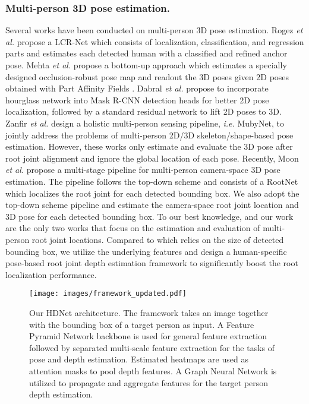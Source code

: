 \documentclass[runningheads]{llncs}
\begin{document}
\subsubsection{Multi-person 3D pose estimation.}
Several works \cite{rogez2017lcr,rogez2019lcr,singleshotmultiperson2018,dabral2019multi,zanfir2018deep} have been conducted on multi-person 3D pose estimation.
Rogez \textit{et al.} \cite{rogez2017lcr} propose a LCR-Net which consists of localization, classification, and regression parts and estimates each detected human with a classified and refined anchor pose.
Mehta \textit{et al.} \cite{singleshotmultiperson2018} propose a bottom-up approach which estimates a specially designed occlusion-robust pose map and readout the 3D poses given 2D poses obtained with Part Affinity Fields \cite{cao2017realtime}.
Dabral \textit{et al.} \cite{dabral2019multi} propose to incorporate hourglass network into Mask R-CNN detection heads for better 2D pose localization, followed by a standard residual network to lift 2D poses to 3D.
Zanfir \textit{et al.} \cite{zanfir2018deep} design a holistic multi-person sensing pipeline, \textit{i.e.} MubyNet, to jointly address the problems of multi-person 2D/3D skeleton/shape-based pose estimation.
However, these works only estimate and evaluate the 3D pose after root joint alignment and ignore the global location of each pose.
Recently, Moon \textit{et al.} \cite{Moon_2019_ICCV_3DMPPE} propose a multi-stage pipeline for multi-person camera-space 3D pose estimation. The pipeline follows the top-down scheme and consists of a RootNet which localizes the root joint for each detected bounding box. 
We also adopt the top-down scheme pipeline and estimate the camera-space root joint location and 3D pose for each detected bounding box.
To our best knowledge, \cite{Moon_2019_ICCV_3DMPPE} and our work are the only two works that focus on the estimation and evaluation of multi-person root joint locations.
Compared to \cite{Moon_2019_ICCV_3DMPPE} which relies on the size of detected bounding box, we utilize the underlying features and design a human-specific pose-based root joint depth estimation framework to significantly boost the root localization performance.

\begin{figure}[t]
\centering
\texttt{[image: images/framework\_updated.pdf]}
\caption{Our HDNet architecture. The framework takes an image together with the bounding box of a target person as input. A Feature Pyramid Network backbone is used for general feature extraction followed by separated multi-scale feature extraction for the tasks of pose and depth estimation. Estimated heatmaps are used as attention masks to pool depth features. A Graph Neural Network is utilized to propagate and aggregate features for the target person depth estimation.}
\label{fig:framework}
\end{figure}
\end{document}
